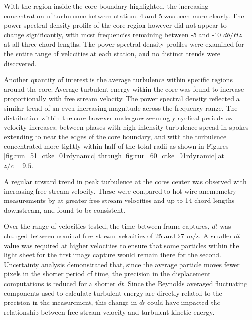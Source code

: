 



With the region inside the core boundary highlighted, the increasing
concentration of turbulence between stations 4 and 5 was seen more clearly. The 
power spectral density profile of the core region however did not appear to 
change significantly, with most frequencies remaining between -5 and -10 
$db/Hz$ at all three chord lengths. The power spectral density profiles were 
examined for the entire range of velocities at each station, and no distinct 
trends were discovered. 





Another quantity of interest is the average turbulence within specific regions 
around the core. Average turbulent energy within the core was found to increase 
proportionally with free stream velocity. The power spectral density reflected 
a similar trend of an even increasing magnitude across the frequency range. The 
distribution within the core however undergoes seemingly cyclical periods as 
velocity increases; between phases with high intensity turbulence spread in 
spokes extending to near the edges of the core boundary, and with the 
turbulence concentrated more tightly within half of the total radii as shown in 
Figures \ref{fig:run_51_ctke_01rdynamic} through 
\ref{fig:run_60_ctke_01rdynamic} at $z/c = 9.5$.












A regular upward trend in peak turbulence at the cores center was observed with 
increasing free stream velocity. These were compared to hot-wire anemometry 
measurements by \cite{thompson2016} at greater free stream velocities and up to 
14 chord lengths downstream, and found to be consistent.

Over the range of velocities tested, the time between frame captures, $dt$ was 
changed between nominal free stream velocities of 25 and 27 $m/s$. A smaller 
$dt$ value was required at higher velocities to ensure that some particles 
within the light sheet for the first image capture would remain there for the 
second. Uncertainty analysis demonstrated that, since the average particle 
moves fewer pixels in the shorter period of time, the precision in the 
displacement computations is reduced for a shorter $dt$. Since the Reynolds 
averaged fluctuating components used to calculate turbulent energy are directly 
related to the precision in the measurement, this change in $dt$ could have 
impacted the relationship between free stream velocity and turbulent kinetic 
energy.

